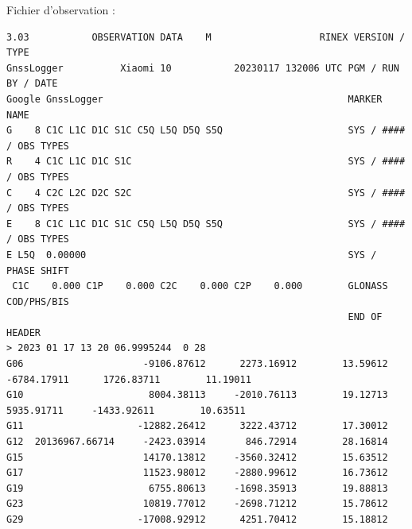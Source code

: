 \documentclass[xcolor=dvipsnames,envcountsect]{beamer}
\begin{document}
\begin{frame}
	
	Fichier d'observation :
	\begin{lstlisting}[basicstyle=\tiny]
3.03           OBSERVATION DATA    M                   RINEX VERSION / TYPE
GnssLogger          Xiaomi 10           20230117 132006 UTC PGM / RUN BY / DATE
Google GnssLogger                                           MARKER NAME
G    8 C1C L1C D1C S1C C5Q L5Q D5Q S5Q                      SYS / #### / OBS TYPES
R    4 C1C L1C D1C S1C                                      SYS / #### / OBS TYPES
C    4 C2C L2C D2C S2C                                      SYS / #### / OBS TYPES
E    8 C1C L1C D1C S1C C5Q L5Q D5Q S5Q                      SYS / #### / OBS TYPES
E L5Q  0.00000                                              SYS / PHASE SHIFT
 C1C    0.000 C1P    0.000 C2C    0.000 C2P    0.000        GLONASS COD/PHS/BIS
															END OF HEADER
> 2023 01 17 13 20 06.9995244  0 28                      
G06                     -9106.87612      2273.16912        13.59612                     -6784.17911      1726.83711        11.19011
G10                      8004.38113     -2010.76113        19.12713                      5935.91711     -1433.92611        10.63511
G11                    -12882.26412      3222.43712        17.30012                                                                
G12  20136967.66714     -2423.03914       846.72914        28.16814                                                                
G15                     14170.13812     -3560.32412        15.63512                                                                
G17                     11523.98012     -2880.99612        16.73612                                                                
G19                      6755.80613     -1698.35913        19.88813                                                                
G23                     10819.77012     -2698.71212        15.78612                                                                
G29                    -17008.92912      4251.70412        15.18812   
	\end{lstlisting}

\end{frame}
\end{document}
